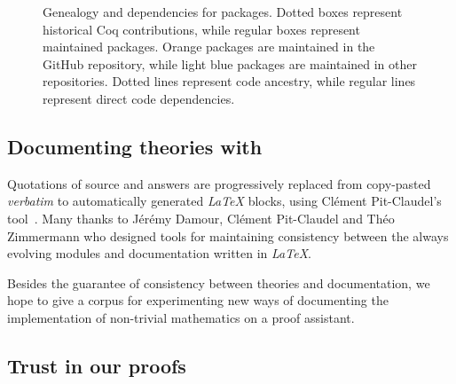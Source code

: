 \documentclass[twoside,a4paper]{book}
\begin{document}
\begin{figure}[ht]
{
}
\caption{Genealogy and dependencies for \Hydras packages. Dotted boxes represent historical Coq contributions, while regular boxes represent maintained \coq packages. Orange packages are maintained in the \Hydras GitHub repository, while light blue packages are maintained in other \community repositories. Dotted lines represent \coq code ancestry, while regular lines represent direct code dependencies.}
  \label{fig:genealogy}
\end{figure}

 

 
 
\subsection{Documenting theories with \alectr}

Quotations of \coq source and answers are progressively replaced from copy-pasted \emph{verbatim} to automatically generated \emph{LaTeX} blocks, using Clément Pit-Claudel's \alectr  tool~\cite{alectryonpaper, alectryongithub}.
Many thanks to Jérémy Damour, Clément Pit-Claudel  and Théo Zimmermann who designed tools for maintaining consistency between the always evolving \coq{} modules and documentation written in \emph{LaTeX}.

Besides the guarantee of consistency between theories and documentation, we hope to give a corpus for experimenting new ways of documenting the implementation of non-trivial mathematics on a proof assistant.

\subsection{Trust in our proofs}
\label{sect:trust-in-proofs}
\end{document}
